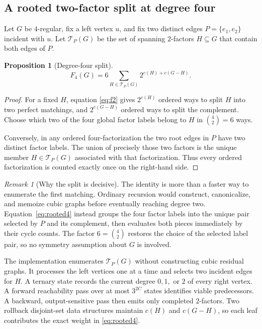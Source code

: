 \documentclass[11pt]{article}
\newtheorem{proposition}[theorem]{Proposition}
\theoremstyle{definition}
\theoremstyle{remark}
\newtheorem{remark}[theorem]{Remark}
\begin{document}
\subsection{A rooted two-factor split at degree four}

Let $G$ be $4$-regular, fix a left vertex $u$, and fix two distinct edges
$P=\{e_1,e_2\}$ incident with $u$.  Let $\mathcal T_P(G)$ be the set of
spanning $2$-factors $H\subseteq G$ that contain both edges of $P$.

\begin{proposition}[Degree-four split]
\begin{equation}
  F_4(G)=6\sum_{H\in\mathcal T_P(G)}2^{c(H)+c(G-H)}.
  \label{eq:rooted4}
\end{equation}
\end{proposition}

\begin{proof}
For a fixed $H$, equation \eqref{eq:f2} gives $2^{c(H)}$ ordered ways to
split $H$ into two perfect matchings, and $2^{c(G-H)}$ ordered ways to split
the complement.  Choose which two of the four global factor labels belong to
$H$ in $\binom42=6$ ways.

Conversely, in any ordered four-factorization the two root edges in $P$ have
two distinct factor labels.  The union of precisely those two factors is the
unique member $H\in\mathcal T_P(G)$ associated with that factorization.
Thus every ordered factorization is counted exactly once on the right-hand
side.
\end{proof}

\begin{remark}[Why the split is decisive]
The identity is more than a faster way to enumerate the first matching.
Ordinary recursion would construct, canonicalize, and memoize cubic graphs
before eventually reaching degree two.  Equation~\eqref{eq:rooted4} instead
groups the four factor labels into the unique pair selected by $P$ and its
complement, then evaluates both pieces immediately by their cycle counts.
The factor $6=\binom42$ restores the choice of the selected label pair, so no
symmetry assumption about $G$ is involved.
\end{remark}

The implementation enumerates $\mathcal T_P(G)$ without constructing cubic
residual graphs.  It processes the left vertices one at a time and selects two
incident edges for $H$.  A ternary state records the current degree
$0,1,$ or $2$ of every right vertex.  A forward reachability pass over at most
$3^{2C}$ states identifies viable predecessors.  A backward, output-sensitive
pass then emits only completed $2$-factors.  Two rollback disjoint-set data
structures maintain $c(H)$ and $c(G-H)$, so each leaf contributes the exact
weight in \eqref{eq:rooted4}.
\end{document}
